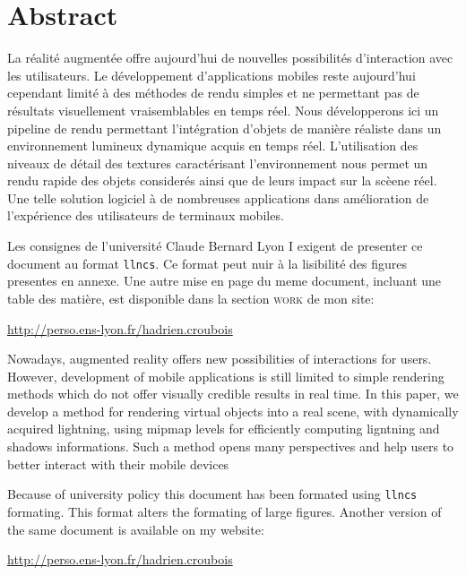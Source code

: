 \documentclass[10pt,a4paper,twoside, twocolumn]{report}
\begin{document}
\vfill

{}
\section*{Abstract}


  \vfill
  
	La réalité augmentée offre aujourd'hui de nouvelles possibilités d’interaction avec les utilisateurs. Le développement d'applications mobiles reste aujourd'hui cependant limité à des méthodes de rendu simples et ne permettant pas de résultats visuellement vraisemblables en temps réel. Nous développerons ici un pipeline de rendu permettant l’intégration d'objets de manière réaliste dans un environnement lumineux dynamique acquis en temps réel. L'utilisation des niveaux de détail des textures caractérisant l'environnement nous permet un rendu rapide des objets considerés ainsi que de leurs impact sur la scèene réel. Une telle solution logiciel à de nombreuses applications dans amélioration de l’expérience des utilisateurs de terminaux mobiles.

	\ifllncs
	Les consignes de l'université Claude Bernard Lyon I exigent de presenter ce document au format \texttt{llncs}. Ce format peut nuir à la lisibilité des figures presentes en annexe. Une autre mise en page du meme document, incluant une table des matière, est disponible dans la section \textsc{work} de mon site:

	\begin{center}\href{http://perso.ens-lyon.fr/hadrien.croubois}{http://perso.ens-lyon.fr/hadrien.croubois}\end{center}
	\fi

	\vspace{1cm}

	Nowadays, augmented reality offers new possibilities of interactions for users. However, development of mobile applications is still limited to simple rendering methods which do not offer visually credible  results in real time. In this paper, we develop a method for rendering virtual objects into a real scene, with dynamically acquired lightning, using mipmap levels for efficiently computing ligntning and shadows informations. Such a method opens many perspectives and help users to better interact with their mobile devices

	\ifllncs
	Because of university policy this document has been formated using \texttt{llncs} formating. This format alters the formating of large figures. Another version of the same document is available on my website:

	\begin{center}\href{http://perso.ens-lyon.fr/hadrien.croubois}{http://perso.ens-lyon.fr/hadrien.croubois}\end{center}
	\fi

  \vfill
\end{document}
